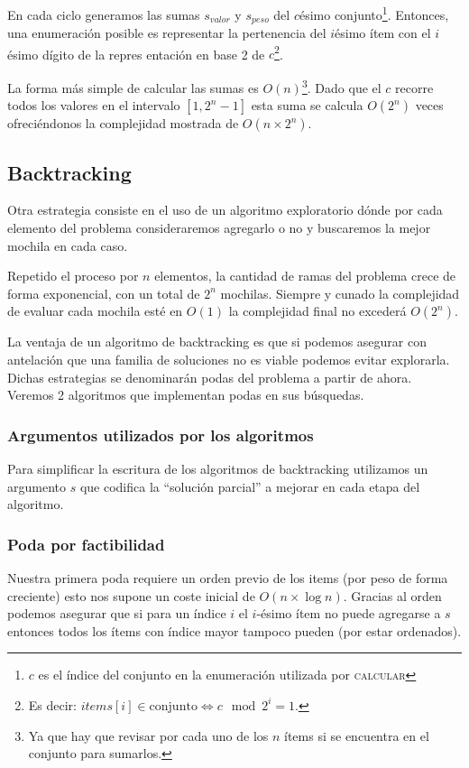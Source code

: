 \documentclass[fleqn, 11pt]{article}
\begin{document}
En cada ciclo generamos las sumas $s_{valor}$ y $s_{peso}$ del $c$ésimo
conjunto\footnote{$c$ es el índice del conjunto en la enumeración utilizada por
\textsc{calcular}}. Entonces, una enumeración posible es representar la
pertenencia del $i$ésimo ítem con el $i$ésimo dígito de la repres entación en
base 2 de $c$\footnote{Es decir: $items[i] \in \text{conjunto} \iff c \mod 2^i
= 1$.}.

La forma más simple de calcular las sumas es $O(n)$\footnote{Ya que hay que
revisar por cada uno de los $n$ ítems si se encuentra en el conjunto para
sumarlos.}.  Dado que el $c$ recorre todos los valores en el intervalo $[1,2^n
- 1]$ esta suma se calcula $O(2^n)$ veces ofreciéndonos la complejidad mostrada
de $O(n \times 2^n)$.

\subsection{Backtracking}

Otra estrategia consiste en el uso de un algoritmo exploratorio dónde por cada
elemento del problema consideraremos agregarlo o no y buscaremos la mejor
mochila en cada caso.

Repetido el proceso por $n$ elementos, la cantidad de ramas del problema crece
de forma exponencial, con un total de $2^n$ mochilas. Siempre y cunado la
complejidad de evaluar cada mochila esté en $O(1)$ la complejidad final no
excederá $O(2^n)$.

La ventaja de un algoritmo de backtracking es que si podemos asegurar con
antelación que una familia de soluciones no es viable podemos evitar
explorarla. Dichas estrategias se denominarán podas del problema a partir de
ahora. Veremos 2 algoritmos que implementan podas en sus búsquedas.

\subsubsection{Argumentos utilizados por los algoritmos}

Para simplificar la escritura de los algoritmos de backtracking utilizamos un
argumento $s$ que codifica la ``solución parcial'' a mejorar en cada etapa del
algoritmo. 

\subsubsection{Poda por factibilidad}

Nuestra primera poda requiere un orden previo de los items (por peso de forma
creciente) esto nos supone un coste inicial de $O(n \times \log n)$. Gracias al
orden podemos asegurar que si para un índice $i$ el $i$-ésimo ítem no puede
agregarse a $s$ entonces todos los ítems con índice mayor tampoco pueden (por
estar ordenados).
\end{document}
